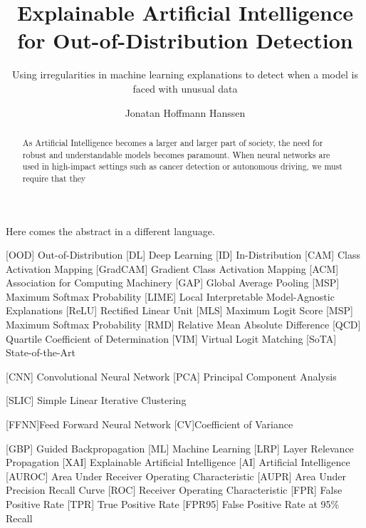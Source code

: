 \documentclass[UKenglish]{uiomasterthesis} %
\title{Explainable Artificial Intelligence for Out-of-Distribution Detection}
\subtitle{Using irregularities in machine learning explanations to detect when a model is faced with unusual data}
\author{Jonatan Hoffmann Hanssen}
\theoremstyle{definition}
\begin{document}
\uiomasterfp[dept={Department of Informatics},
program={Robotics and Intelligent Systems},
supervisors={Hugo Lewi Hammer \and Kyrre Harald Glette}, image={/home/jona/.config/zsh/cat.jpg},
long]

\frontmatter{}
\begin{abstract}
As Artificial Intelligence becomes a larger and larger part of society, the need for robust and understandable models becomes paramount. When neural networks are used in high-impact settings such as cancer detection or autonomous driving, we must require that they 
\end{abstract}

\begin{xabstract}[Sammendrag]
Here comes the abstract in a different language.
\end{xabstract}


\tableofcontents{}
\listoffigures{}
\listoftables{}

\begin{acronym}[ICANN]
       [OOD]   {Out-of-Distribution}
       [DL]   {Deep Learning}
     [ID] {In-Distribution}
     [CAM] {Class Activation Mapping}
     [GradCAM] {Gradient Class Activation Mapping}
     [ACM] {Association for Computing Machinery}
       [GAP]   {Global Average Pooling}
       [MSP]   {Maximum Softmax Probability}
       [LIME]   {Local Interpretable Model-Agnostic Explanations}
       [ReLU]   {Rectified Linear Unit}
       [MLS]   {Maximum Logit Score}
       [MSP]   {Maximum Softmax Probability}
       [RMD]   {Relative Mean Absolute Difference}
       [QCD]   {Quartile Coefficient of Determination}
       [VIM]   {Virtual Logit Matching}
       [SoTA]   {State-of-the-Art}

       [CNN]   {Convolutional Neural Network}
       [PCA]   {Principal Component Analysis}

     [SLIC] {Simple Linear Iterative Clustering}

    [FFNN]{Feed Forward Neural Network}
    [CV]{Coefficient of Variance}

       [GBP]   {Guided Backpropagation}
       [ML]   {Machine Learning}
       [LRP]   {Layer Relevance Propagation}
       [XAI]   {Explainable Artificial Intelligence}
       [AI]   {Artificial Intelligence}
       [AUROC]   {Area Under Receiver Operating Characteristic}
       [AUPR]   {Area Under Precision Recall Curve}
       [ROC]   {Receiver Operating Characteristic}
       [FPR]   {False Positive Rate}
       [TPR]   {True Positive Rate}
       [FPR95]   {False Positive Rate at 95\% Recall}
\end{acronym}
\end{document}
